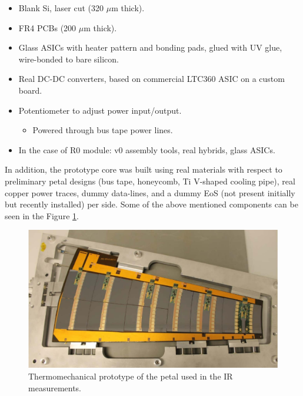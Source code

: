 		\begin{itemize}
			\renewcommand{\labelitemi}{$\diamond$}
			\item Blank Si, laser cut (320 $\mu$m thick).
			\item FR4 PCBs (200 $\mu$m thick).
			\item Glass ASICs with heater pattern and bonding pads, glued with UV glue, wire-bonded to bare silicon.
			\item Real DC-DC converters, based on commercial LTC360 ASIC on a custom board.
			\item Potentiometer to adjust power input/output.
			\begin{itemize}
			\renewcommand{\labelitemi}{$\bullet$}
				\item Powered through bus tape power lines.
			\end{itemize}
			\item In the case of R0 module: v0 assembly tools, real hybrids, glass ASICs.
		\end{itemize}
		
		In addition, the prototype core was built using real materials with respect to preliminary petal designs (bus tape, honeycomb, Ti V-shaped cooling pipe), real copper power traces, dummy data-lines, and a dummy EoS (not present initially but recently installed) per side. Some of the above mentioned components can be seen in the Figure \ref{fig2.2}.
		
		\begin{figure}[ht!]
			\centering
			\captionsetup{justification=centering,margin=2cm}
			\includegraphics[scale=0.35]{Figures/Chapter02/PetalConstruction.jpg}
			\caption{Thermomechanical prototype of the petal  used in the IR measurements.}\label{fig2.2}
		\end{figure}\bigskip
		
